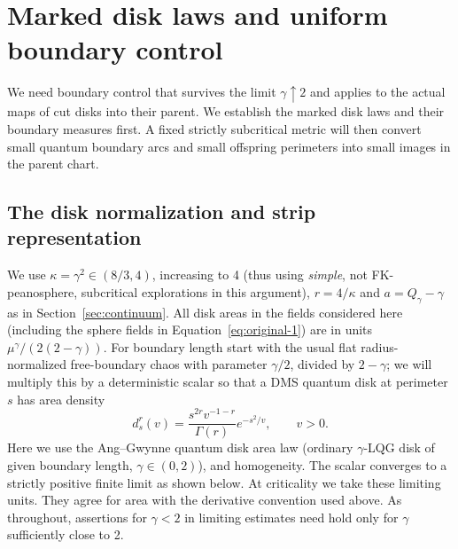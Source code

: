 \section{Marked disk laws and uniform boundary control}\label{sec:proxy}

We need boundary control that survives the limit $\gamma\uparrow2$ and
applies to the actual maps of cut disks into their parent.  We establish
the marked disk laws and their boundary measures first.  A fixed strictly
subcritical metric will then convert small quantum boundary arcs and
small offspring perimeters into small images in the parent chart.

\subsection{The disk normalization and strip representation}\label{proxy:disk-normalization}

We use \(\kappa=\gamma^2\in(8/3,4)\), increasing to 4 (thus using \emph{simple}, not FK-peanosphere, subcritical explorations in this argument), \(r=4/\kappa\) and \(a=Q_\gamma-\gamma\) as in Section~\ref{sec:continuum}.
All disk areas in the fields considered here (including the sphere fields in Equation~\eqref{eq:original-1}) are in units \(\mu^\gamma/(2(2-\gamma))\).
For boundary length start with the usual flat radius-normalized free-boundary chaos with parameter \(\gamma/2\), divided by \(2-\gamma\); we will multiply this by a deterministic scalar so that a DMS quantum disk at perimeter \(s\) has area density
\[
 d_s^r(v)=\frac{s^{2r}v^{-1-r}}{\Gamma(r)}e^{-s^2/v},\qquad v>0 .
\]
Here we use the Ang--Gwynne quantum disk area law \citep[Theorem~1.2]{AngGwynneDisk} (ordinary \(\gamma\)-LQG disk of given boundary length, \(\gamma\in(0,2)\)), and homogeneity.
The scalar converges to a strictly positive finite limit as shown below.
At criticality we take these limiting units.
They agree for area with the derivative convention used above.
As throughout, assertions for \(\gamma<2\) in limiting estimates need hold only for \(\gamma\) sufficiently close to 2.

